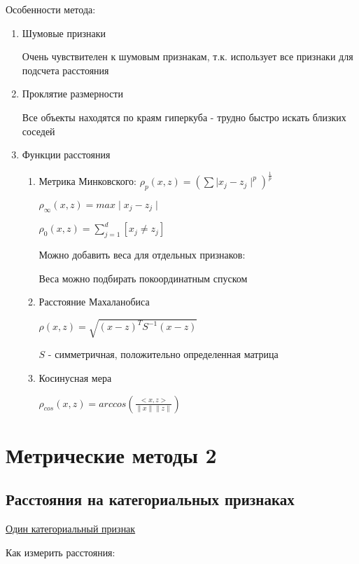 \documentclass[a4paper, 12pt]{article}
\newcommand\norm[1]{\left\lVert#1\right\rVert}
\begin{document}
Особенности метода:

\begin{enumerate}
    \item Шумовые признаки
    
    Очень чувствителен к шумовым признакам, 
    т.к. использует все признаки для 
    подсчета расстояния

    \item Проклятие размерности
    
    Все объекты находятся по краям гиперкуба - трудно быстро искать 
    близких соседей

    \item Функции расстояния
    \begin{enumerate}
        \item Метрика Минковского: 
        $\rho_p(x, z) = (\sum \mid x_j - z_j \mid^p)^{\frac{1}{p}}$

        $\rho_{\infty}(x, z) = max \mid x_j - z_j \mid$

        $\rho_0(x, z) = \sum_{j = 1}^d [x_j \neq z_j]$
        
        Можно добавить веса для отдельных признаков:

        Веса можно подбирать покоординатным спуском
        \item Расстояние Махаланобиса
        
        $\rho(x, z) = \sqrt{(x - z)^T S^{-1} (x - z)}$

        $S$ - симметричная, положительно определенная матрица

        \item Косинусная мера
        

        $\rho_{cos}(x, z) = 
        arccos(\frac{<x, z>}{\norm{x}\norm{z}})$
    \end{enumerate}
\end{enumerate}

\section{Метрические методы 2}

\subsection{Расстояния на категориальных признаках}

\underline{Один категориальный признак}

Как измерить расстояния:
\end{document}
